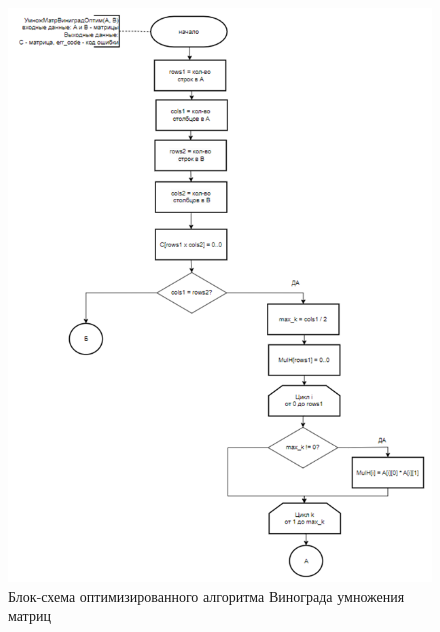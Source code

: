 \begin{figure}[H]
    \centering
    \includegraphics[width=1.05\textwidth]{img/block_3_1.png}
    \caption{Блок-схема оптимизированного алгоритма Винограда умножения матриц}
    \label{fig:block_3_1}
\end{figure}

